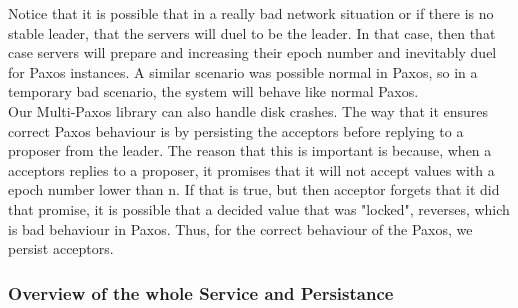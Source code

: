 \documentclass[a4paper]{article}
\begin{document}
Notice that it is possible that in a really bad network situation or if there is no stable leader, that the servers will duel to be the leader.
In that case, then that case servers will prepare and increasing their epoch number and inevitably duel for Paxos instances.
A similar scenario was possible normal in Paxos, so in a temporary bad scenario, the system will  behave like normal Paxos.
\\
\indent Our Multi-Paxos library can also handle disk crashes.
The way that it ensures correct Paxos behaviour is by persisting the acceptors before replying to a proposer from the leader.
The reason that this is important is because, when a acceptors replies to a proposer, it promises that it will not accept values with a epoch number lower than n.
If that is true, but then acceptor forgets that it did that promise, it is possible that a decided value that was "locked", reverses, which is bad behaviour in Paxos.
Thus, for the correct behaviour of the Paxos, we persist acceptors.

\subsubsection{Overview of the whole Service and Persistance}
\end{document}

